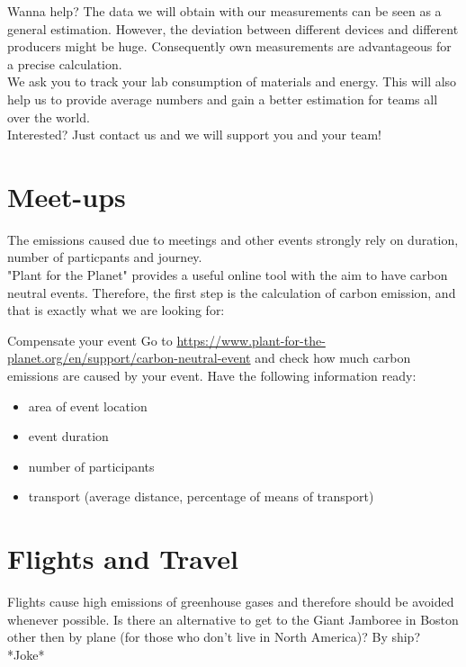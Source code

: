 \newpage

\begin{suggest}{Wanna help?}
	The data we will obtain with our measurements can be seen as a general estimation.
	However, the deviation between different devices and different producers might be huge. Consequently own measurements are advantageous for a precise calculation.\\
	We ask you to track your lab consumption of materials and energy. This will also help us to provide average numbers and gain a better estimation for teams all over the world. \\
	Interested? Just contact us and we will support you and your team!
	
\end{suggest}

\section{Meet-ups}

The emissions caused due to meetings and other events strongly rely on duration, number of particpants and journey. \\
"Plant for the Planet" provides a useful online tool with the aim to have carbon neutral events. Therefore, the first step is the calculation of carbon emission, and that is exactly what we are looking for:

\begin{suggest} {Compensate your event}
	Go to \url{https://www.plant-for-the-planet.org/en/support/carbon-neutral-event} %
	and check how much carbon emissions are caused by your event. Have the following information ready:
	\begin{itemize}
		\item area of event location
		\item event duration
		\item number of participants
		\item transport (average distance, percentage of means of transport)
	\end{itemize}
\end{suggest}


\section{Flights and Travel}
Flights cause high emissions of greenhouse gases and therefore should be avoided whenever possible. Is there an alternative to get to the Giant Jamboree in Boston other then by plane (for those who don't live in North America)? By ship? *Joke* 


